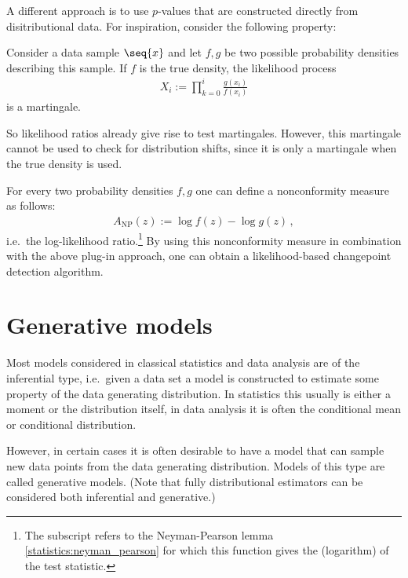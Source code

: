     A different approach is to use $p$-values that are constructed directly from disitributional data. For inspiration, consider the following property:
    \begin{property}
        Consider a data sample $\seq{x}$ and let $f,g$ be two possible probability densities describing this sample. If $f$ is the true density, the likelihood process
        \begin{gather}
            X_i := \prod_{k=0}^i \frac{g(x_i)}{f(x_i)}
        \end{gather}
        is a martingale.
    \end{property}
    So likelihood ratios already give rise to test martingales. However, this martingale cannot be used to check for distribution shifts, since it is only a martingale when the true density is used.
    \begin{example}
        For every two probability densities $f,g$ one can define a nonconformity measure as follows:
        \begin{gather}
            A_\mathrm{NP}(z) := \log f(z)-\log g(z)\,,
        \end{gather}
        i.e.~the log-likelihood ratio.\footnote{The subscript refers to the Neyman-Pearson lemma \ref{statistics:neyman_pearson} for which this function gives the (logarithm) of the test statistic.} By using this nonconformity measure in combination with the above plug-in approach, one can obtain a likelihood-based changepoint detection algorithm.
    \end{example}

\section{Generative models}

    Most models considered in classical statistics and data analysis are of the inferential type, i.e.~given a data set a model is constructed to estimate some property of the data generating distribution. In statistics this usually is either a moment or the distribution itself, in data analysis it is often the conditional mean or conditional distribution.

    However, in certain cases it is often desirable to have a model that can sample new data points from the data generating distribution. Models of this type are called generative models. (Note that fully distributional estimators can be considered both inferential and generative.)

